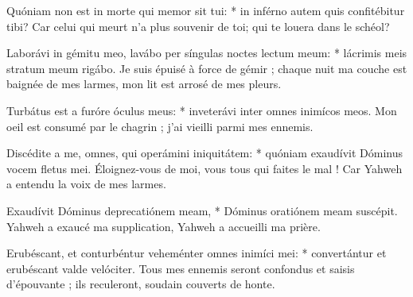 \begin{paracol}{2}
\LigneParacol
{Quóniam non est in morte qui memor sit tui: * in inférno autem quis confitébitur tibi?}
{Car celui qui meurt n'a plus souvenir de toi; qui te louera dans le schéol? }

\LigneParacol
{Laborávi in gémitu meo, lavábo per síngulas noctes lectum meum: * lácrimis meis stratum meum rigábo.}
{Je suis épuisé à force de gémir ; chaque nuit ma couche est baignée de mes larmes, mon lit est arrosé de mes pleurs. }

\LigneParacol
{Turbátus est a furóre óculus meus: * inveterávi inter omnes inimícos meos.}
{Mon oeil est consumé par le chagrin ; j'ai vieilli parmi mes ennemis. }

\LigneParacol
{Discédite a me, omnes, qui operámini iniquitátem: * quóniam exaudívit Dóminus vocem fletus mei.}
{Éloignez-vous de moi, vous tous qui faites le mal ! Car Yahweh a entendu la voix de mes larmes. }

\LigneParacol
{Exaudívit Dóminus deprecatiónem meam, * Dóminus oratiónem meam suscépit.}
{Yahweh a exaucé ma supplication, Yahweh a accueilli ma prière. }

\LigneParacol
{Erubéscant, et conturbéntur veheménter omnes inimíci mei: * convertántur et erubéscant valde velóciter.}
{Tous mes ennemis seront confondus et saisis d'épouvante ; ils reculeront, soudain couverts de honte.  }

\end{paracol}
